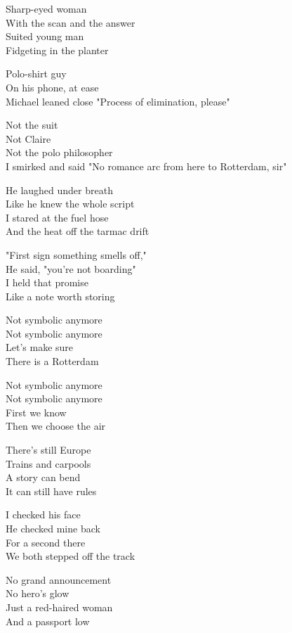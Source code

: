 \begin{lyrics}
Sharp-eyed woman\\
With the scan and the answer\\
Suited young man\\
Fidgeting in the planter

Polo-shirt guy\\
On his phone, at ease\\
Michael leaned close
"Process of elimination, please"

Not the suit\\
Not Claire\\
Not the polo philosopher\\
I smirked and said
"No romance arc from here to Rotterdam, sir"

He laughed under breath\\
Like he knew the whole script\\
I stared at the fuel hose\\
And the heat off the tarmac drift

"First sign something smells off,"\\
He said, "you’re not boarding"\\
I held that promise\\
Like a note worth storing

Not symbolic anymore\\
Not symbolic anymore\\
Let’s make sure\\
There is a Rotterdam

Not symbolic anymore\\
Not symbolic anymore\\
First we know\\
Then we choose the air

There’s still Europe\\
Trains and carpools\\
A story can bend\\
It can still have rules

I checked his face\\
He checked mine back\\
For a second there\\
We both stepped off the track

No grand announcement\\
No hero’s glow\\
Just a red-haired woman\\
And a passport low


\end{lyrics}
